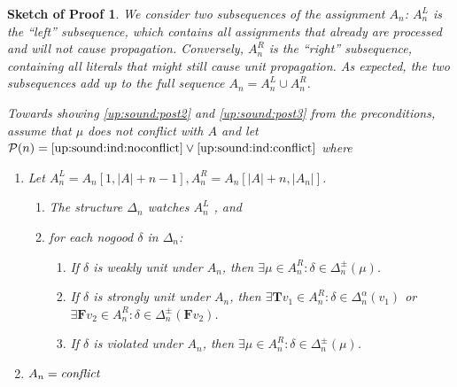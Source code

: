\documentclass{vutinfth} %
\newtheorem{proof-sketch}{Sketch of Proof}[chapter]
\newcommand{\ass}{A}
\newcommand{\bT}{\mathbf{T}}
\newcommand{\bF}{\mathbf{F}}
\newcommand{\sgl}{\mu}
\begin{document}
\begin{proof-sketch}
We consider two subsequences of the assignment $A_n$: $\ass_n^L$ is the \enquote{left} subsequence, which contains all assignments that already are processed and will not cause propagation. Conversely, $\ass_n^R$ is the \enquote{right} subsequence, containing all literals that might still cause unit propagation. As expected, the two subsequences add up to the full sequence $A_n = A_n^L \cup A_n^R$.

Towards showing \ref{up:sound:post2} and \ref{up:sound:post3} from the preconditions, assume that $\sgl$ does not conflict with $\ass$ and let $\mathcal{P}(n) = \textrm{\ref{up:sound:ind:noconflict}} \vee \textrm{\ref{up:sound:ind:conflict}}$ where

\begin{enumerate}[label=(\Roman*)]
	\item Let $\ass_n^L = \ass_n[1, |A| + n - 1], \ass_n^R = \ass_n[|A| + n, |\ass_n|]$. \label{up:sound:ind:noconflict}
	    \begin{enumerate}[label=(\alph*),ref=\theenumi(\alph*)]
	     \item The structure $\Delta_n$ watches $\ass^L_n$ \label{up:sound:ind:watches}, and
	     \item for each nogood $\delta$ in $\Delta_n$:\label{up:sound:ind:lr}
		\begin{enumerate}[label=(\roman*),ref=\theenumii(\roman*)]
			\item If $\delta$ is weakly unit under $\ass_n$, then $\exists \sgl \in A_n^R : \delta \in \Delta_n^\pm(\sgl)$. \label{up:sound:ind:wu}
			\item If $\delta$ is strongly unit under $\ass_n$, then $\exists {\bT v_1} \in A_n^R : \delta \in \Delta_n^\alpha(v_1)$ or $\exists {\bF v_2} \in A_n^R : \delta \in \Delta_n^\pm({\bF v_2})$. \label{up:sound:ind:su}
			\item If $\delta$ is violated under $\ass_n$, then $\exists \sgl \in A_n^R : \delta \in \Delta_n^\pm(\sgl)$. \label{up:sound:ind:vio}
		\end{enumerate}
	\end{enumerate}
	\item $\ass_n = \emph{conflict}$ \label{up:sound:ind:conflict}
\end{enumerate}


\end{proof-sketch}
\end{document}
